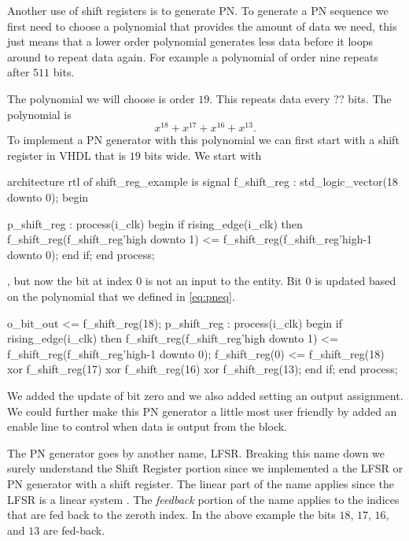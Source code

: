 Another use of shift registers is to generate \ac{PN}. To generate a \ac{PN} sequence we first need to choose a polynomial that provides the amount of data we need, this just means that a lower order polynomial generates less data before it loops around to repeat data again. For example a polynomial of order nine repeats after $511$ bits. 

The polynomial we will choose is order $19$. This repeats data every ?? bits. The polynomial is 
\begin{equation}
x^{18} + x^{17} + x^{16} + x^{13}. 
\label{eq:pneq}
\end{equation}
\noindent
To implement a \ac{PN} generator with this polynomial we can first start with a shift register in \ac{VHDL} that is $19$ bits wide. We start with 

\begin{VHDLlisting}[tabsize=8]
architecture rtl of shift\_reg\_example is
	signal f\_shift\_reg : std\_logic\_vector(18 downto 0);
begin

p\_shift\_reg : process(i\_clk)
begin
	if rising\_edge(i\_clk) then
		f\_shift\_reg(f\_shift\_reg'high downto 1) <= f\_shift\_reg(f\_shift\_reg'high-1 downto 0);
	end if;
end process;
\end{VHDLlisting}

, but now the bit at index $0$ is not an input to the entity. Bit $0$ is updated based on the polynomial that we defined in \ref{eq:pneq}. 	

\begin{VHDLlisting}[tabsize=8]
o\_bit\_out <= f\_shift\_reg(18);
p\_shift\_reg : process(i\_clk)
begin
	if rising\_edge(i\_clk) then
		f\_shift\_reg(f\_shift\_reg'high downto 1) <= f\_shift\_reg(f\_shift\_reg'high-1 downto 0);
		f\_shift\_reg(0) <= f\_shift\_reg(18) xor 
						  f\_shift\_reg(17) xor 
						  f\_shift\_reg(16) xor 
						  f\_shift\_reg(13);
	end if;
end process;
\end{VHDLlisting}

We added the update of bit zero and we also added setting an output assignment. We could further make this \ac{PN} generator a little most user friendly by added an enable line to control when data is output from the block.

The \ac{PN} generator goes by another name, \ac{LFSR}. Breaking this name down we surely understand the \ac{Shift Register} portion since we implemented a the \ac{LFSR} or \ac{PN} generator with a shift register. The linear part of the name applies since the \ac{LFSR} is a linear system \cite{??}. The \emph{feedback} portion of the name applies to the indices that are fed back to the zeroth index. In the above example the bits $18$, $17$, $16$, and $13$ are fed-back.

